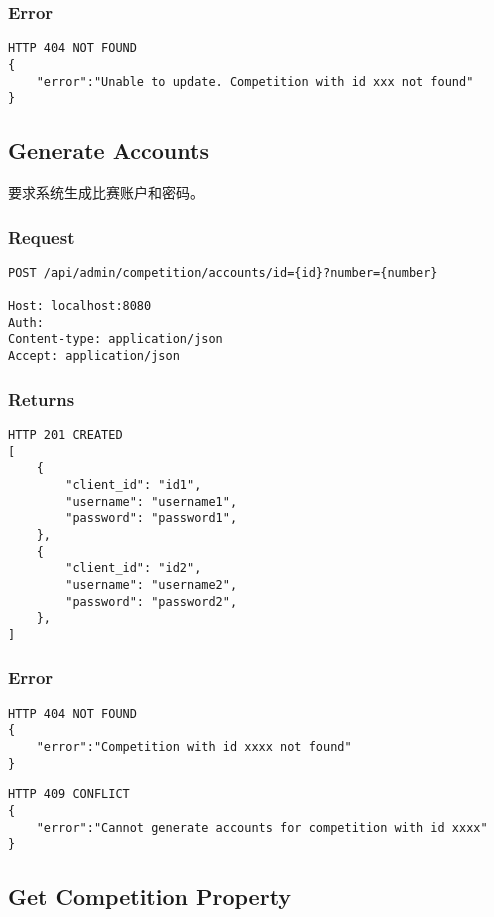 \documentclass{article}
\begin{document}
\subsubsection*{Error}
\begin{lstlisting}
HTTP 404 NOT FOUND
{
    "error":"Unable to update. Competition with id xxx not found"
}
\end{lstlisting}

\subsection{Generate Accounts}

要求系统生成比赛账户和密码。

\subsubsection*{Request}
\begin{lstlisting}
POST /api/admin/competition/accounts/id={id}?number={number}

Host: localhost:8080
Auth:
Content-type: application/json
Accept: application/json
\end{lstlisting}

\subsubsection*{Returns}
\begin{lstlisting}
HTTP 201 CREATED
[
    {
        "client_id": "id1",
	    "username": "username1",
	    "password": "password1",
	},
	{
        "client_id": "id2",
	    "username": "username2",
	    "password": "password2",
	},
]
\end{lstlisting}

\subsubsection*{Error}
\begin{lstlisting}
HTTP 404 NOT FOUND
{
    "error":"Competition with id xxxx not found"
}
\end{lstlisting}

\begin{lstlisting}
HTTP 409 CONFLICT
{
    "error":"Cannot generate accounts for competition with id xxxx"
}
\end{lstlisting}

\subsection{Get Competition Property}
\end{document}
